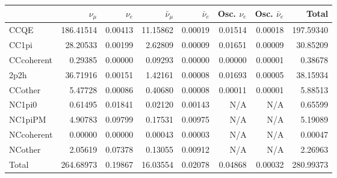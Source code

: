 \begin{tabular} { | l ||r | r | r | r | r | r | | r | }
\hline
              & $\nu_\mu$            & $\nu_e$              & $\bar{\nu}_{\mu}$    & $\bar{\nu}_{e}$      & Osc. $\nu_e$         & Osc. $\bar{\nu}_{e}$ & Total                \\ \hline\hline
 CCQE         & 186.41514            & 0.00413              & 11.15862             & 0.00019              & 0.01514              & 0.00018              & 197.59340            \\ \hline
 CC1pi        & 28.20533             & 0.00199              & 2.62809              & 0.00009              & 0.01651              & 0.00009              & 30.85209             \\ \hline
 CCcoherent   & 0.29385              & 0.00000              & 0.09293              & 0.00000              & 0.00000              & 0.00001              & 0.38678              \\ \hline
 2p2h         & 36.71916             & 0.00151              & 1.42161              & 0.00008              & 0.01693              & 0.00005              & 38.15934             \\ \hline
 CCother      & 5.47728              & 0.00086              & 0.40680              & 0.00008              & 0.00011              & 0.00001              & 5.88513              \\ \hline
 NC1pi0       & 0.61495              & 0.01841              & 0.02120              & 0.00143              & N/A                  & N/A                  & 0.65599              \\ \hline
 NC1piPM      & 4.90783              & 0.09799              & 0.17531              & 0.00975              & N/A                  & N/A                  & 5.19089              \\ \hline
 NCcoherent   & 0.00000              & 0.00000              & 0.00043              & 0.00003              & N/A                  & N/A                  & 0.00047              \\ \hline
 NCother      & 2.05619              & 0.07378              & 0.13055              & 0.00912              & N/A                  & N/A                  & 2.26963              \\ \hline
\hline
 Total        & 264.68973            & 0.19867              & 16.03554             & 0.02078              & 0.04868              & 0.00032              & 280.99373            \\ \hline

\end{tabular}
